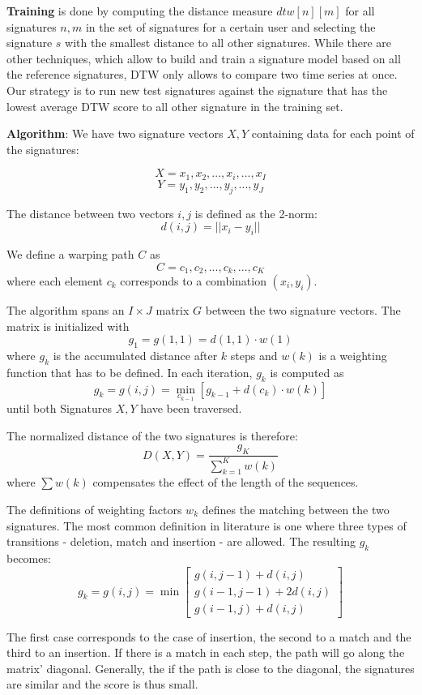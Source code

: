 \documentclass[a4paper, oneside]{csthesis}
\begin{document}
\textbf{Training} is done by computing the distance measure $dtw[n][m]$ for all signatures $n, m$ in the set of signatures for a certain user and selecting the signature $s$ with the smallest distance to all other signatures. While there are other techniques, which allow to build and train a signature model based on all the reference signatures, DTW only allows to compare two time series at once. Our strategy is to run new test signatures against the signature that has the lowest average DTW score to all other signature in the training set.


\textbf{Algorithm}: We have two signature vectors $X,Y$ containing data for each point of the signatures:

$$X = x_1, x_2, ... , x_i, ... , x_I$$ $$Y = y_1, y_2, ..., y_j, ..., y_J$$

The distance between two vectors $i,j$ is defined as the 2-norm: $$d(i,j) = ||x_i - y_i||$$

We define a warping path $C$ as $$ C = c_1, c_2, ..., c_k, ..., c_K $$ where each element $c_k$ corresponds to a combination $(x_i, y_i)$.

The algorithm spans an $I \times J$ matrix $G$ between the two signature vectors. The matrix is initialized with $$g_1 = g(1,1) = d(1,1) \cdot w(1)$$ where $g_k$ is the accumulated distance after $k$ steps and $w(k)$ is a weighting function that has to be defined.
In each iteration, $g_k$ is computed as $$g_k = g(i,j) = \min\limits_{c_{k-1}} [g_{k-1}+d(c_k) \cdot w(k)]$$ until both Signatures $X,Y$ have been traversed.

The normalized distance of the two signatures is therefore: $$D(X,Y) = \frac{g_K}{\sum_{k=1}^K w(k)}$$ where $\sum w(k)$ compensates the effect of the length of the sequences.

The definitions of weighting factors $w_k$ defines the matching between the two signatures. The most common definition in literature is one where three types of transitions - deletion, match and insertion - are allowed. The resulting $g_k$ becomes:
$$g_k = g(i,j) = \min \left[\begin{array}{c}g(i,j-1) + d(i,j) \\g(i-1,j-1)+ 2 d(i,j) \\g(i-1,j) + d(i,j)\end{array}\right]$$

The first case corresponds to the case of insertion, the second to a match and the third to an insertion. If there is a match in each step, the path will go along the matrix' diagonal. Generally, the if the path is close to the diagonal, the signatures are similar and the score is thus small.
\end{document}

